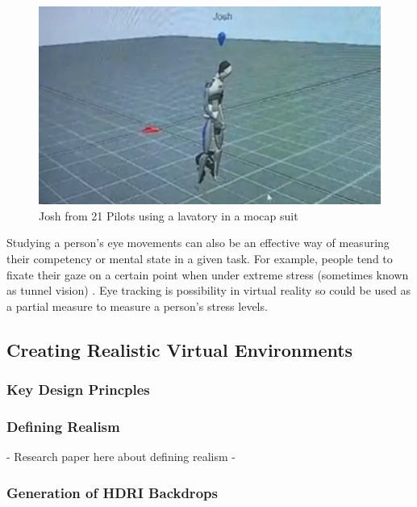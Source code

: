 \documentclass[12pt]{article}
\begin{document}
\begin{figure}[h]
  \centering
  \begin{minipage}[b]{0.7\linewidth}
    \includegraphics[width=\linewidth]{images/josh-mocap-concert.png}
    \caption{Josh from 21 Pilots using a lavatory in a mocap suit}
    \label{fig:joshmocapconcert}
  \end{minipage}
\end{figure}

Studying a person's eye movements can also be an effective way of measuring their competency or mental state in a given task. For example, people tend to fixate their gaze on a certain point when under extreme stress (sometimes known as tunnel vision) \cite{herten2017role}. Eye tracking is possibility in virtual reality \cite{clay2019eye} so could be used as a partial measure to measure a person's stress levels. 


\subsection{Creating Realistic Virtual Environments}

\subsubsection{Key Design Princples}

\subsubsection{Defining Realism}

- Research paper here about defining realism -

\subsubsection{Generation of HDRI Backdrops}
\end{document}
